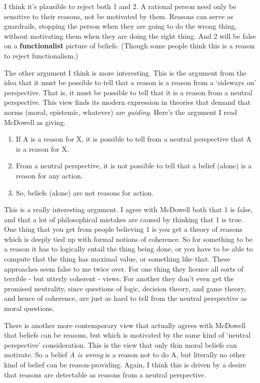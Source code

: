 \documentclass[
]{article}
\providecommand{\tightlist}{%
  \setlength{\itemsep}{0pt}\setlength{\parskip}{0pt}}
\begin{document}
I think it's plausible to reject both 1 and 2. A rational person need
only be sensitive to their reasons, not be motivated by them. Reasons
can serve as guardrails, stopping the person when they are going to do
the wrong thing, without motivating them when they are doing the right
thing. And 2 will be false on a \textbf{functionalist} picture of
beliefs. (Though some people think this is a reason to reject
functionalism.)

The other argument I think is more interesting. This is the argument
from the idea that it must be possible to tell that a reason is a reason
from a `sideways on' perspective. That is, it must be possible to tell
that it is a reason from a neutral perspective. This view finds its
modern expression in theories that demand that norms (moral, epistemic,
whatever) are \emph{guiding}. Here's the argument I read McDowell as
giving.

\begin{enumerate}
\def\labelenumi{\arabic{enumi}.}
\tightlist
\item
  If A is a reason for X, it is possible to tell from a neutral
  perspective that A is a reason for X.
\item
  From a neutral perspective, it is not possible to tell that a belief
  (alone) is a reason for any action.
\item
  So, beliefs (alone) are not reasons for action.
\end{enumerate}

This is a really interesting argument. I agree with McDowell both that 1
is false, and that a lot of philosophical mistakes are caused by
thinking that 1 is true. One thing that you get from people believing 1
is you get a theory of reasons which is deeply tied up with formal
notions of coherence. So for something to be a reason it has to
logically entail the thing being done, or you have to be able to compute
that the thing has maximal value, or something like that. These
approaches seem false to me twice over. For one thing they licence all
sorts of terrible - but utterly coherent - views. For another they don't
even get the promised neutrality, since questions of logic, decision
theory, and game theory, and hence of coherence, are just as hard to
tell from the neutral perspective as moral questions.

There is another more contemporary view that actually agrees with
McDowell that beliefs can be reasons, but which is motivated by the same
kind of `neutral perspective' consideration. This is the view that only
thin moral beliefs can motivate. So a belief \emph{A is wrong} is a
reason not to do A, but literally no other kind of belief can be
reason-providing. Again, I think this is driven by a desire that reasons
are detectable as reasons from a neutral perspective.
\end{document}
